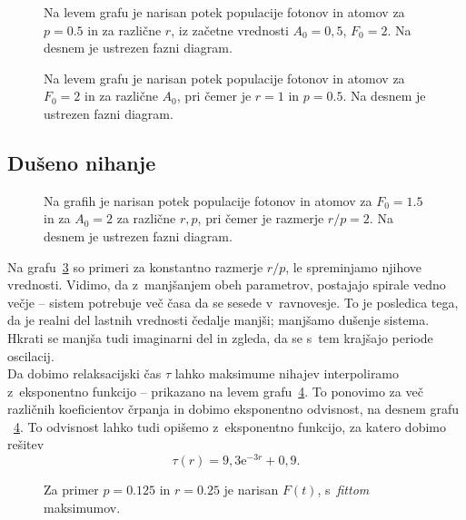 \documentclass[a4paper,pdftex,10pt]{article}
\numberwithin{equation}{section} %
\numberwithin{figure}{section} %
\numberwithin{table}{section} %
\begin{document}
\begin{figure}    
    \resizebox{0.48\linewidth}{!}{}
    \resizebox{0.48\linewidth}{!}{}
    \caption{Na levem grafu je narisan potek populacije fotonov in atomov za $p=0.5$ in 
    za različne $r$, iz začetne vrednosti $A_0=0,5$, $F_0=2$. Na desnem je ustrezen fazni 
    diagram.}
    \label{slika11}
\end{figure}
\begin{figure}    
    \resizebox{0.48\linewidth}{!}{}
    \resizebox{0.48\linewidth}{!}{}
    \caption{Na levem grafu je narisan potek populacije fotonov in atomov za $F_0=2$ in 
    za različne $A_0$, pri čemer je $r=1$ in $p=0.5$. Na desnem je ustrezen fazni diagram.}
    \label{slika12}
\end{figure}

\subsection{Dušeno nihanje}
\begin{figure}    
    \resizebox{0.48\linewidth}{!}{}
    \resizebox{0.48\linewidth}{!}{}
    \caption{Na grafih je narisan potek populacije fotonov in atomov za $F_0=1.5$ in 
    za $A_0=2$ za različne $r,p$, pri čemer je razmerje $r/p=2$. Na desnem je ustrezen 
    fazni diagram.}
    \label{slika13}
\end{figure}

Na grafu~\ref{slika13} so primeri za konstantno razmerje $r/p$, le spreminjamo njihove 
vrednosti. Vidimo, da z~manjšanjem obeh parametrov, postajajo spirale vedno večje -- sistem
potrebuje več časa da se sesede v~ravnovesje. To je posledica tega, da je realni del
lastnih vrednosti čedalje manjši; manjšamo dušenje sistema. Hkrati se manjša tudi imaginarni
del in zgleda, da se s~tem krajšajo periode oscilacij. \\ %
Da dobimo relaksacijski čas $\tau$ lahko maksimume nihajev interpoliramo z~eksponentno
funkcijo -- prikazano na levem grafu~\ref{slika10}. To ponovimo za več različnih 
koeficientov črpanja in dobimo eksponentno odvisnost, na desnem grafu ~\ref{slika10}.
To odvisnost lahko tudi opišemo z~eksponentno funkcijo, za katero dobimo rešitev 
$$\tau(r) = 9,3 \mathrm{e}^{-3 r} + 0,9.$$

\begin{figure}    
    \centering
    \resizebox{0.48\linewidth}{!}{}
    \resizebox{0.48\linewidth}{!}{}
    \caption{Za primer $p=0.125$ in $r=0.25$ je narisan $F(t)$, s~\emph{fittom} maksimumov.}
    \label{slika10}
\end{figure}
\end{document}
